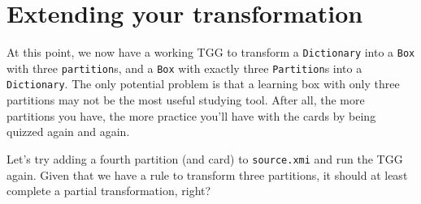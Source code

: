 \newpage
\section{Extending your transformation}
\genHeader

At this point, we now have a working TGG to transform a \texttt{Dictionary} into a \texttt{Box} with three \texttt{partition}s, and a \texttt{Box} with
exactly three \texttt{Partition}s into a \texttt{Dictionary}. The only potential problem is that a learning box with only three partitions may not be the most
useful studying tool. After all, the more partitions you have, the more practice you'll have with the cards by being quizzed again and again.

Let's try adding a fourth partition (and card) to \texttt{source.xmi} and run the TGG again. Given that we have a rule to transform three partitions, it should
at least complete a partial transformation, right? 

